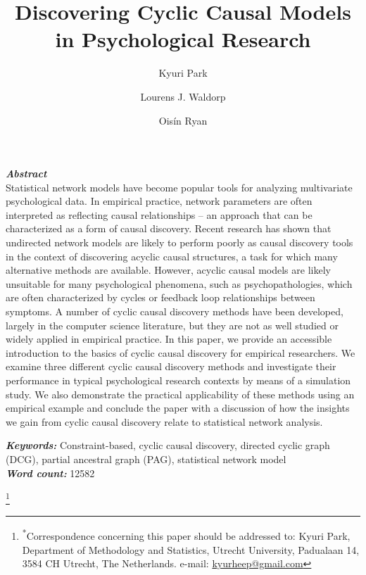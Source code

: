 \documentclass[twoside, 11pt]{article}
\title{Discovering Cyclic Causal Models in Psychological Research 
}
\author[1*]{Kyuri Park}
\author[2]{Lourens J. Waldorp}
\author[1]{Ois\'{i}n Ryan}
\affil[1]{Department of Methodology and Statistics, Utrecht University}%
\affil[2]{Department of Psychology, University of Amsterdam}
\date{ }
\newcommand\blfootnote[1]{%
  \begingroup
  \renewcommand\thefootnote{}\footnote{#1}%
  \addtocounter{footnote}{-1}%
  \endgroup
}
\begin{document}
\maketitle
\thispagestyle{firstpage}

\begin{adjustwidth}{1.5cm}{1.5cm}

\noindent \textbf{\textit{Abstract }} \\
\noindent Statistical network models have become popular tools for analyzing multivariate psychological data. In empirical practice, network parameters are often interpreted as reflecting causal relationships – an approach that can be characterized as a form of causal discovery. Recent research has shown that undirected network models are likely to perform poorly as causal discovery tools in the context of discovering acyclic causal structures, a task for which many alternative methods are available. However, acyclic causal models are likely unsuitable for many psychological phenomena, such as psychopathologies, which are often characterized by cycles or feedback loop relationships between symptoms. A number of cyclic causal discovery methods have been developed, largely in the computer science literature, but they are not as well studied or widely applied in empirical practice. In this paper, we provide an accessible introduction to the basics of cyclic causal discovery for empirical researchers. We examine three different cyclic causal discovery methods and investigate their performance in typical psychological research contexts by means of a simulation study. We also demonstrate the practical applicability of these methods using an empirical example and conclude the paper with a discussion of how the insights we gain from cyclic causal discovery relate to statistical network analysis.


\vspace{1.5mm}
\noindent\textbf{{\textit{Keywords: }}}%
Constraint-based, cyclic causal discovery, directed cyclic graph (DCG), partial ancestral graph (PAG), statistical network model\\
\noindent\textbf{{\textit{Word count: }}}12582%

\end{adjustwidth}

\blfootnote{\textsuperscript{\scriptsize{*}}Correspondence concerning this paper should be addressed to: Kyuri Park, Department of Methodology and Statistics, Utrecht University, Padualaan 14, 3584 CH Utrecht, The Netherlands. e-mail: \href{mailto:kyurheep@gmail.com}{kyurheep@gmail.com}} 
\end{document}
